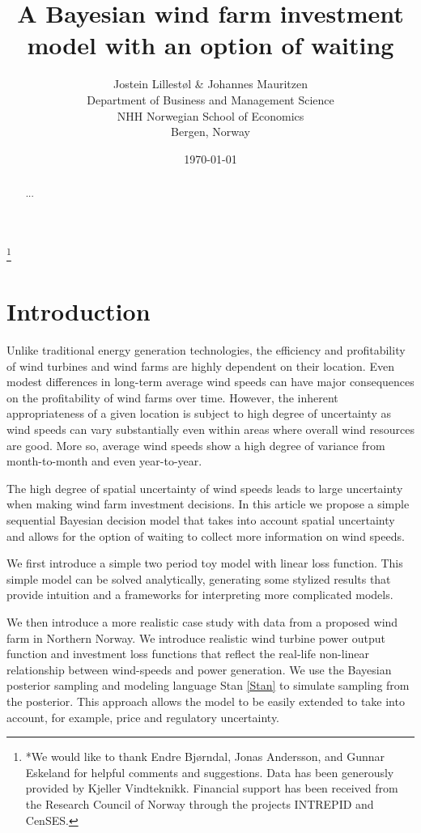 \documentclass[11pt]{article}
\title{A Bayesian wind farm investment model with an option of waiting}
\author{Jostein Lillest\o l & Johannes Mauritzen\\
 		Department of Business and Management Science\\
   NHH Norwegian School of Economics\\
   Bergen, Norway\\
		}
\date{\today}
\begin{document}
\begin{spacing}{1} %

\maketitle

\begin{abstract}
 ...
\end{abstract}

\thanks{*We would like to thank Endre Bj\o rndal, Jonas Andersson, and Gunnar Eskeland for helpful comments and suggestions. Data has been generously provided by Kjeller Vindteknikk. Financial support has been received from the Research Council of Norway through the projects INTREPID and CenSES.}
\end{spacing}

\section{Introduction}

Unlike traditional energy generation technologies, the efficiency and profitability of wind turbines and wind farms are highly dependent on their location. Even modest differences in long-term average wind speeds can have major consequences on the profitability of wind farms over time. However, the inherent appropriateness of a given location is subject to high degree of uncertainty as wind speeds can vary substantially even within areas where overall wind resources are good. More so, average wind speeds show a high degree of variance from month-to-month and even year-to-year.

The high degree of spatial uncertainty of wind speeds leads to large uncertainty when making wind farm investment decisions. In this article we propose a simple sequential Bayesian decision model that takes into account spatial uncertainty and allows for the option of waiting to collect more information on wind speeds.

We first introduce a simple two period toy model with linear loss function. This simple model can be solved analytically, generating some stylized results that provide intuition and a frameworks for interpreting more complicated models. 

We then introduce a more realistic case study with data from a proposed wind farm in Northern Norway. We introduce realistic wind turbine power output function and investment loss functions that reflect the real-life non-linear relationship between wind-speeds and power generation. We use the Bayesian posterior sampling and modeling language Stan \ref{Stan} to simulate sampling from the posterior. This approach allows the model to be easily extended to take into account, for example, price and regulatory uncertainty.   
\end{document}

